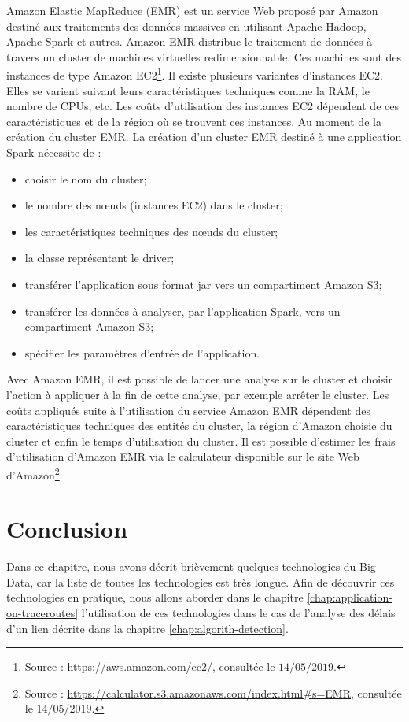 Amazon Elastic MapReduce (EMR) est  un service Web proposé par Amazon  destiné aux traitements des données massives en utilisant Apache Hadoop, Apache Spark et autres.
Amazon EMR distribue le traitement de données à travers un cluster  de machines virtuelles redimensionnable. Ces machines sont des instances de type Amazon EC2\footnote{Source : \url{https://aws.amazon.com/ec2/}, consultée le $14/05/2019$.}.
Il existe plusieurs variantes d'instances EC2. Elles se varient suivant leurs caractéristiques techniques comme la RAM, le nombre de CPUs, etc. Les coûts d'utilisation des instances EC2 dépendent de ces caractéristiques et de la région où se trouvent ces instances. Au moment de la création du cluster EMR. La création d'un cluster EMR destiné à une application Spark nécessite de  :
\begin{itemize}
	\item choisir le nom du cluster;
	\item le nombre des n\oe{}uds (instances EC2) dans le cluster;
	\item les caractéristiques techniques des n\oe{}uds du cluster;
	\item la classe représentant le driver;
	\item transférer l'application sous format jar vers un compartiment Amazon S3;
	\item transférer les données à analyser, par l'application Spark, vers un compartiment Amazon S3;
	\item spécifier les paramètres d'entrée de l'application.
\end{itemize}

Avec Amazon EMR, il est possible de lancer une analyse sur le cluster et choisir l'action à appliquer à la fin de cette analyse, par exemple arrêter le cluster. Les coûts appliqués suite à l'utilisation du service Amazon EMR dépendent des caractéristiques techniques des entités du cluster, la région d'Amazon choisie du cluster et enfin le temps d'utilisation du cluster. Il est possible d'estimer les frais d'utilisation d'Amazon EMR via le calculateur disponible sur le site Web d'Amazon\footnote{Source : \url{https://calculator.s3.amazonaws.com/index.html\#s=EMR}, consultée le $14/05/2019$.}.



\section{Conclusion}

Dans ce chapitre,  nous avons décrit brièvement  quelques technologies du Big Data, car la liste de toutes les technologies est très longue. Afin de découvrir ces technologies en pratique, nous allons aborder dans le chapitre \ref{chap:application-on-traceroutes} l'utilisation de ces technologies dans le cas de l'analyse des délais d'un lien décrite dans la chapitre \ref{chap:algorith-detection}.    









